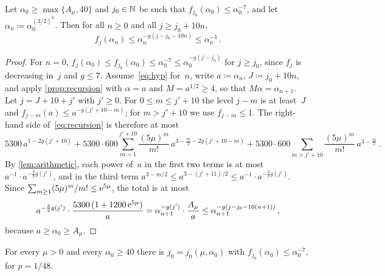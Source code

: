 \documentclass[11pt,letterpaper]{article}
\begin{document}
\begin{theorem}
\label{thm:induction}
Let $\alpha_0\ge\max\{A_\mu,40\}$ and $j_0\in\mathbb N$ be such that $f_{j_0}(\alpha_0)\le\alpha_0^{-7}$, and let $\alpha_n\coloneqq\alpha_0^{(3/2)^n}$. Then for all $n\ge0$ and all $j\ge j_0+10n$,
\begin{equation}
\label{eq:hyp}
  f_j(\alpha_n)\le\alpha_n^{-g(j-j_0-10n)}\le\alpha_n^{-1}\,.
\end{equation}
\end{theorem}

\begin{proof}
For $n=0$, $f_j(\alpha_0)\le f_{j_0}(\alpha_0)\le\alpha_0^{-7}\le\alpha_0^{-g(j-j_0)}$ for $j\ge j_0$, since $f_j$ is decreasing in~$j$ and $g\le7$. Assume~\eqref{eq:hyp} for~$n$, write $a\coloneqq\alpha_n$, $J\coloneqq j_0+10n$, and apply \cref{prop:recursion} with $\alpha=a$ and $M=a^{1/2}\ge4$, so that $M\alpha=\alpha_{n+1}$. Let $j=J+10+j'$ with $j'\ge0$. For $0\le m\le j'+10$ the level $j-m$ is at least~$J$ and $f_{j-m}(a)\le a^{-g(j'+10-m)}$; for $m>j'+10$ we use $f_{j-m}\le1$. The right-hand side of~\eqref{eq:recursion} is therefore at most
\begin{equation*}
  5300\,a^{1-2g(j'+10)}+5300\cdot600\sum_{m=1}^{j'+10}\frac{(5\mu)^m}{m!}\,a^{3-\frac m2-2g(j'+10-m)}+5300\cdot600\sum_{m>j'+10}\frac{(5\mu)^m}{m!}\,a^{3-\frac m2}\,.
\end{equation*}
By \cref{lem:arithmetic}, each power of~$a$ in the first two terms is at most $a^{-1}\cdot a^{-\frac32g(j')}$, and in the third term $a^{3-m/2}\le a^{3-(j'+11)/2}\le a^{-1}\cdot a^{-\frac32g(j')}$. Since $\sum_{m\ge1}(5\mu)^m/m!\le\mathrm{e}^{5\mu}$, the total is at most
\begin{equation*}
  a^{-\frac32g(j')}\cdot\frac{5300\,(1+1200\,\mathrm{e}^{5\mu})}{a}=\alpha_{n+1}^{-g(j')}\cdot\frac{A_\mu}{a}\le\alpha_{n+1}^{-g(j-j_0-10(n+1))}\,,
\end{equation*}
because $a\ge\alpha_0\ge A_\mu$.
\end{proof}

\begin{lemma}
\label{lem:base}
For every $\mu>0$ and every $\alpha_0\ge40$ there is $j_0=j_0(\mu,\alpha_0)$ with $f_{j_0}(\alpha_0)\le\alpha_0^{-7}$, for $p=1/48$.
\end{lemma}
\end{document}
